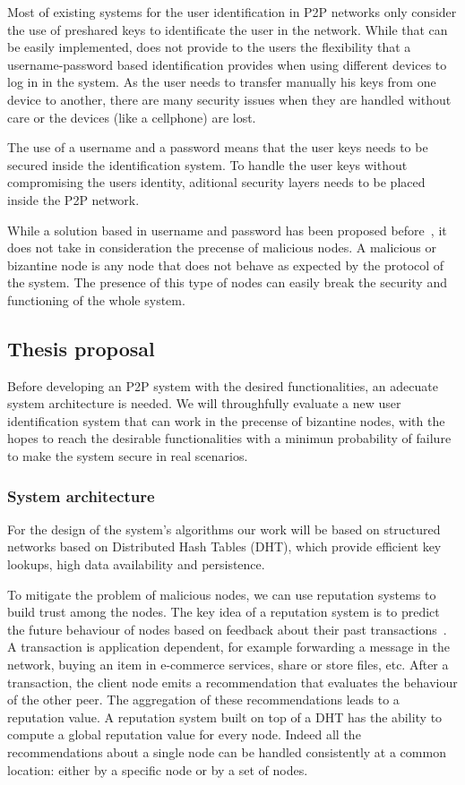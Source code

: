 \documentclass[12pt,spanish]{article}
\begin{document}
Most of existing systems for the user identification in P2P networks only consider the
use of preshared keys to identificate the user in the network. While that can
be easily implemented, does not provide to the users the flexibility that a
username-password based identification provides when using different devices to
log in in the system. As the user needs to transfer manually his keys from one
device to another, there are many security issues when they are handled without
care or the devices (like a cellphone) are lost. 

The use of a username and a password means that the user keys needs to be secured inside the identification system.
To handle the user keys without compromising the users identity, aditional
security layers needs to be placed inside the P2P network.

While a solution based in username and password has been proposed
before~\cite{kreitz2012passwords}, it does not take in consideration the
precense of malicious nodes. A malicious or bizantine node is any node that does
not behave as expected by the protocol of the system. The presence of this type
of nodes can easily break the security and functioning of the whole system.


\subsection{Thesis proposal}

Before developing an P2P system with the desired functionalities, an adecuate
system architecture is needed. We will throughfully evaluate a new user
identification system that can work in the precense of bizantine nodes, with
the hopes to reach the desirable functionalities with a minimun probability of
failure to make the system secure in real scenarios.

\subsubsection{System architecture}

For the design of the system's algorithms our work will be based on structured
networks based on Distributed Hash Tables (DHT), which provide efficient key
lookups, high data availability and persistence.

To mitigate the problem of malicious nodes, we can use reputation systems to
build trust among the nodes. The key
idea of a reputation system is to predict the future behaviour
of nodes based on feedback about their past
transactions~\cite{Resnick:2000:RS:355112.355122}. A
transaction is application dependent, for example forwarding a
message in the network, buying an item in e-commerce services,
share or store files, etc. After a transaction, the client node emits
a recommendation that evaluates the behaviour of the other peer.
The aggregation of these recommendations leads to a reputation
value.
A reputation system built on top of a DHT has the ability
to compute a global reputation value for every node. Indeed
all the recommendations about a single node can be handled
consistently at a common location: either by a specific node
or by a set of nodes.
\end{document}

